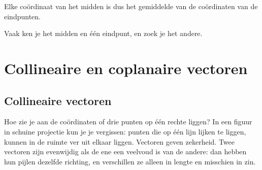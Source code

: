 Elke coördinaat van het midden is dus het gemiddelde van de coördinaten van de eindpunten.


Vaak ken je het midden en één eindpunt, en zoek je het andere.


\begin{oefeningen}

\end{oefeningen}

\section{Collineaire en coplanaire vectoren}

\subsection{Collineaire vectoren}

Hoe zie je aan de coördinaten of drie punten op één rechte liggen? In een figuur in schuine projectie kun je je vergissen: punten die op één lijn lijken te liggen, kunnen in de ruimte ver uit elkaar liggen. Vectoren geven zekerheid. Twee vectoren zijn evenwijdig als de ene een veelvoud is van de andere: dan hebben hun pijlen dezelfde richting, en verschillen ze alleen in lengte en misschien in zin.

